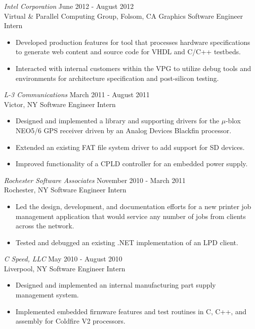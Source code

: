 \documentclass[10pt]{res} %
\begin{document}
\begin{resume}
{\sl Intel Corporation} \hfill June 2012 - August 2012 \\
Virtual \& Parallel Computing Group, Folsom, CA \hfill Graphics Software Engineer Intern
\begin{itemize} \itemsep -2pt %
\item Developed production features for tool that processes hardware specifications to generate web content and source code for VHDL and C/C++ testbeds.
\item Interacted with internal customers within the VPG to utilize debug tools and environments for architecture specification and post-silicon testing.
\end{itemize}

{\sl L-3 Communications} \hfill March 2011 - August 2011 \\
Victor, NY \hfill Software Engineer Intern
\begin{itemize} \itemsep -2pt %
\item Designed and implemented a library and supporting drivers for the $\mu$-blox NEO5/6 GPS receiver driven by an Analog Devices Blackfin processor.
\item Extended an existing FAT file system driver to add support for SD devices.
\item Improved functionality of a CPLD controller for an embedded power supply.
\end{itemize}

{\sl Rochester Software Associates} \hfill November 2010 - March 2011 \\
Rochester, NY \hfill Software Engineer Intern
\begin{itemize} \itemsep -2pt %
\item Led the design, development, and documentation efforts for a new printer job management application that would service any number of jobs from clients across the network.
\item Tested and debugged an existing .NET implementation of an LPD client.
\end{itemize}

{\sl C Speed, LLC} \hfill May 2010 - August 2010 \\
Liverpool, NY \hfill Software Engineer Intern
\begin{itemize} \itemsep -2pt %
\item Designed and implemented an internal manufacturing part supply management system.
\item Implemented embedded firmware features and test routines in C, C++, and assembly for Coldfire V2 processors.
\end{itemize}


\end{resume}
\end{document}
